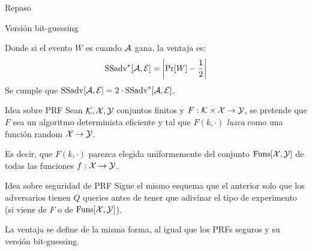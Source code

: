 \begin{frame}[allowframebreaks]{Repaso}
\begin{alertblock}{Versión bit-guessing}
\begin{centering}
    \end{centering}

    Donde si el evento $W$ es cuando $\mathcal{A}$ gana, la ventaja es:
    \begin{equation*}
      \text{SSadv}^*[\mathcal{A}, \mathcal{E}] = \left|\text{Pr}[W] - \frac{1}{2}\right|
    \end{equation*}
    Se cumple que $\text{SSadv}[\mathcal{A}, \mathcal{E}] = 2 \cdot \text{SSadv}^*[\mathcal{A}, \mathcal{E}]$.
  \end{alertblock}

  \begin{block}{Idea sobre PRF}
    Sean $\mathcal{K}, \mathcal{X}, \mathcal{Y}$ conjuntos finitos y $F : \mathcal{K} \times \mathcal{X} \to \mathcal{Y}$, se pretende que $F$ sea un 
    algoritmo determinista eficiente y tal que $F(k, \cdot)$ \textit{luzca} como una 
    función random $\mathcal{X} \to \mathcal{Y}$.

    Es decir, que $F(k, \cdot)$ parezca elegida uniformemente del conjunto $\text{Funs}[\mathcal{X}, \mathcal{Y}]$
    de todas las funciones $f : \mathcal{X} \to \mathcal{Y}$.
  \end{block}
  \begin{block}{Idea sobre seguridad de PRF}
    Sigue el mismo esquema que el anterior solo que los adversarios tienen $Q$ queries antes 
    de tener que adivinar el tipo de experimento (si viene de $F$ o de $\text{Funs}[\mathcal{X}, \mathcal{Y}]$).

    La ventaja se define de la misma forma, al igual que los PRFs seguros y su versión 
    bit-guessing.
  \end{block}
\end{frame}

